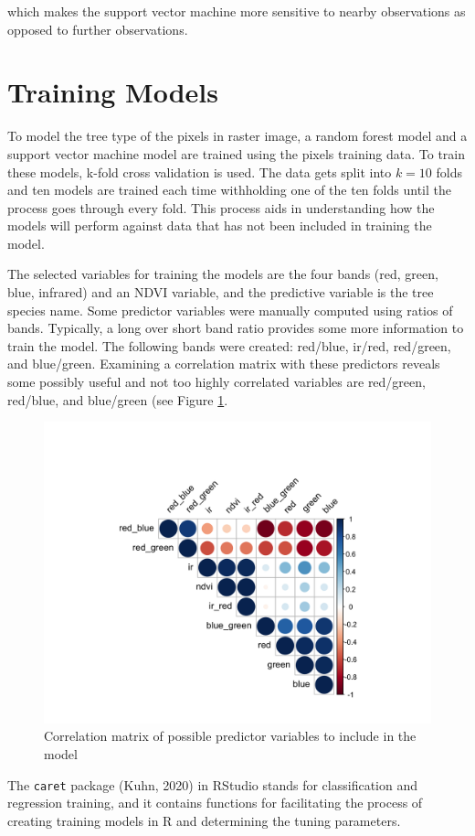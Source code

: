 \documentclass[12pt,twoside]{reedthesis}
\begin{document}
which makes the support vector machine more sensitive to nearby observations as opposed to further observations.

\hypertarget{training-models}{%
\section{Training Models}\label{training-models}}

To model the tree type of the pixels in raster image, a random forest model and a support vector machine model are trained using the pixels training data. To train these models, k-fold cross validation is used. The data gets split into \(k = 10\) folds and ten models are trained each time withholding one of the ten folds until the process goes through every fold. This process aids in understanding how the models will perform against data that has not been included in training the model.

The selected variables for training the models are the four bands (red, green, blue, infrared) and an NDVI variable, and the predictive variable is the tree species name. Some predictor variables were manually computed using ratios of bands. Typically, a long over short band ratio provides some more information to train the model. The following bands were created: red/blue, ir/red, red/green, and blue/green. Examining a correlation matrix with these predictors reveals some possibly useful and not too highly correlated variables are red/green, red/blue, and blue/green (see Figure \ref{fig:corrmatrix}.
\begin{figure}

{\centering \includegraphics[width=0.5\linewidth]{figure/corrmatrix} 

}

\caption{Correlation matrix of possible predictor variables to include in the model}\label{fig:corrmatrix}
\end{figure}
The \texttt{caret} package (Kuhn, 2020) in RStudio stands for classification and regression training, and it contains functions for facilitating the process of creating training models in R and determining the tuning parameters.
\end{document}
